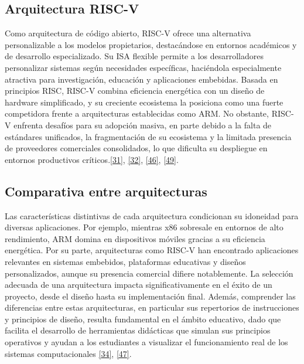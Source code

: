 \documentclass[12pt,oneside]{templates/unerthesis}
\begin{document}
\hypertarget{arquitectura-risc-v}{%
\subsection{Arquitectura RISC-V}\label{arquitectura-risc-v}}

Como arquitectura de código abierto, RISC-V ofrece una alternativa personalizable a los modelos propietarios, destacándose en entornos académicos y de desarrollo especializado. Su ISA flexible permite a los desarrolladores personalizar sistemas según necesidades específicas, haciéndola especialmente atractiva para investigación, educación y aplicaciones embebidas. Basada en principios RISC, RISC-V combina eficiencia energética con un diseño de hardware simplificado, y su creciente ecosistema la posiciona como una fuerte competidora frente a arquitecturas establecidas como ARM. No obstante, RISC-V enfrenta desafíos para su adopción masiva, en parte debido a la falta de estándares unificados, la fragmentación de su ecosistema y la limitada presencia de proveedores comerciales consolidados, lo que dificulta su despliegue en entornos productivos críticos.\protect\hyperlink{ref-waterman_risc-v_2014}{{[}31{]}}, \protect\hyperlink{ref-harris2015digital}{{[}32{]}}, \protect\hyperlink{ref-hennessy2017computer_riscv}{{[}46{]}}, \protect\hyperlink{ref-patterson2016computer}{{[}49{]}}.

\hypertarget{comparativa-entre-arquitecturas}{%
\subsection{Comparativa entre arquitecturas}\label{comparativa-entre-arquitecturas}}

Las características distintivas de cada arquitectura condicionan su idoneidad para diversas aplicaciones. Por ejemplo, mientras x86 sobresale en entornos de alto rendimiento, ARM domina en dispositivos móviles gracias a su eficiencia energética. Por su parte, arquitecturas como RISC-V han encontrado aplicaciones relevantes en sistemas embebidos, plataformas educativas y diseños personalizados, aunque su presencia comercial difiere notablemente. La selección adecuada de una arquitectura impacta significativamente en el éxito de un proyecto, desde el diseño hasta su implementación final. Además, comprender las diferencias entre estas arquitecturas, en particular sus repertorios de instrucciones y principios de diseño, resulta fundamental en el ámbito educativo, dado que facilita el desarrollo de herramientas didácticas que simulan sus principios operativos y ayudan a los estudiantes a visualizar el funcionamiento real de los sistemas computacionales \protect\hyperlink{ref-patterson_computer_2014}{{[}34{]}}, \protect\hyperlink{ref-arm_evolution_2025}{{[}47{]}}.
\end{document}
